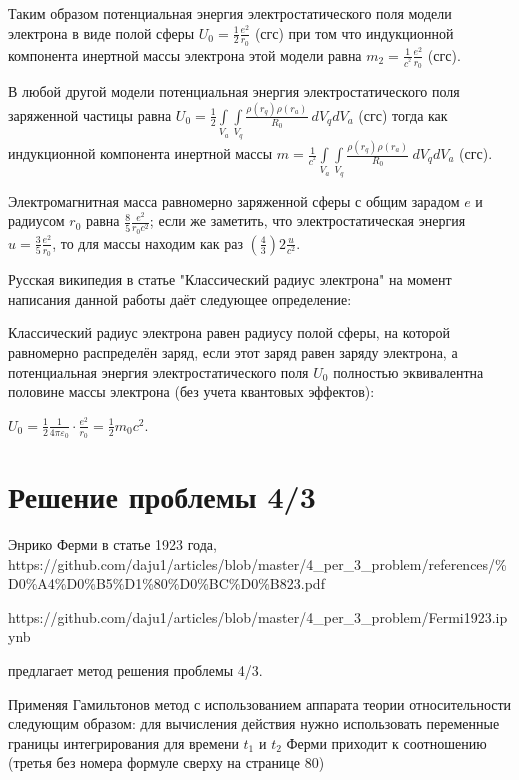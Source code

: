 \documentclass[11pt]{article}
\begin{document}
Таким образом потенциальная энергия электростатического поля модели
электрона в виде полой сферы
\({U}_{0} =\frac{1}{2}\frac{e^2}{{{r}_{0}}}\) (сгс) при том что
индукционной компонента инертной массы электрона этой модели равна
\(m_2 =\frac{1}{{{c}^{^{2}}}}\frac{e^2}{{{r}_{0}}}\) (сгс).

В любой другой модели потенциальная энергия электростатического поля
заряженной частицы равна
\({U}_{0}=\frac{1}{2}\int\limits_{{{V}_{a}}}{\int\limits_{{{V}_{q}}}{\frac{\rho \left( {{r}_{q}} \right)\rho \left( {{r}_{a}} \right)}{R_{0}}}}\ d{{V}_{q}}d{{V}_{a}}\)
(сгс) тогда как индукционной компонента инертной массы
\(m=\frac{1}{{{c}^{^{2}}}}\int\limits_{{{V}_{a}}}{\int\limits_{{{V}_{q}}}{\frac{\rho \left( {{r}_{q}} \right)\rho \left( {{r}_{a}} \right)}{R_{0}}}}\ d{{V}_{q}}d{{V}_{a}}\)
(сгс).

    Электромагнитная масса равномерно заряженной сферы с общим зарадом \(e\)
и радиусом \(r_0\) равна \(\frac{8}{5} \frac{e^2}{r_0 c^2}\); если же
заметить, что электростатическая энергия
\(u = \frac{3}{5} \frac{e^2}{r_0}\), то для массы находим как раз
\(\left(\frac{4}{3}\right) 2 \frac{u}{c^2}\).

Русская википедия в статье "Классический радиус электрона" на момент
написания данной работы даёт следующее определение:

Классический радиус электрона равен радиусу полой сферы, на которой
равномерно распределён заряд, если этот заряд равен заряду электрона, а
потенциальная энергия электростатического поля \({U}_{0}\) полностью
эквивалентна половине массы электрона (без учета квантовых эффектов):

\({\displaystyle U_{0}={\frac {1}{2}}{\frac {1}{4\pi \varepsilon _{0}}}\cdot {\frac {e^{2}}{r_{0}}}={\frac {1}{2}}m_{0}c^{2}}\).

    \section{Решение проблемы
4/3}\label{ux440ux435ux448ux435ux43dux438ux435-ux43fux440ux43eux431ux43bux435ux43cux44b-43}

Энрико Ферми в статье \cite{Fermi1923} 1923 года,
https://github.com/daju1/articles/blob/master/4\_per\_3\_problem/references/\%D0\%A4\%D0\%B5\%D1\%80\%D0\%BC\%D0\%B823.pdf

https://github.com/daju1/articles/blob/master/4\_per\_3\_problem/Fermi1923.ipynb

предлагает метод решения проблемы 4/3.

    Применяя Гамильтонов метод с использованием аппарата теории
относительности следующим образом: для вычисления действия нужно
использовать переменные границы интегрирования для времени \(t_1\) и
\(t_2\) Ферми приходит к соотношению (третья без номера формуле сверху
на странице 80)
\end{document}
